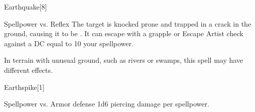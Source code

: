 \begin{spellsection}{Earthquake}[8]
    \begin{spellheader}
    \end{spellheader}
    \begin{spellcontent}
        \begin{spelltargetinginfo}
        \end{spelltargetinginfo}
        \begin{spelleffects}
            \begin{spellattack}{Spellpower vs. Reflex}
                \spellsuccess The target is knocked prone and trapped in a crack in the ground, causing it to be \immobilized. It can escape with a grapple or Escape Artist check against a DC equal to 10 \add your spellpower.
            \end{spellattack}
        \end{spelleffects}
    \end{spellcontent}
    \begin{spellfooter}
        \spellnotes In terrain with unusual ground, such as rivers or swamps, this spell may have different effects.

        \physicalspellnotes
        \miscastyou
    \end{spellfooter}
\end{spellsection}

\begin{spellsection}{Earthspike}[1]
    \begin{spellheader}
    \end{spellheader}
    \begin{spellcontent}
        \begin{spelltargetinginfo}
            \spellrng{\rngmed}
        \end{spelltargetinginfo}
        \begin{spelleffects}
            \begin{spellattack}{Spellpower vs. Armor defense}
                \spellsuccess 1d6 piercing damage per spellpower.
            \end{spellattack}
        \end{spelleffects}
    \end{spellcontent}
    \begin{spellfooter}
        \miscastrandom
    \end{spellfooter}
\end{spellsection}

